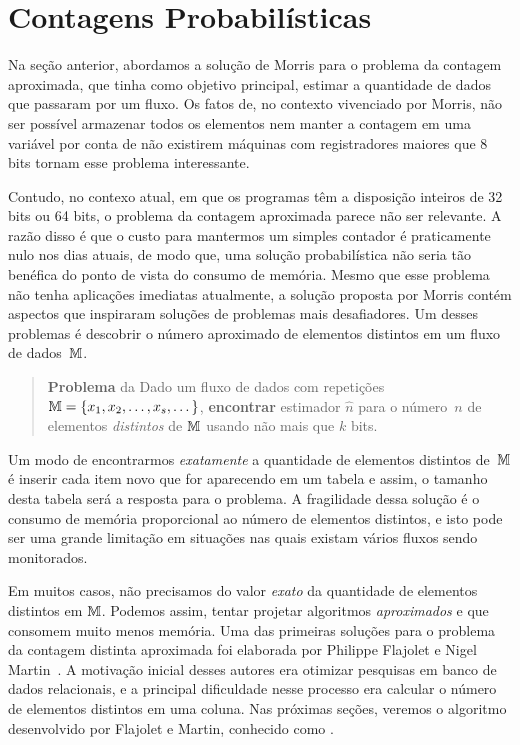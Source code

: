 \newcommand{\bitmap}{\proc{bmap}}
\newcommand{\pcounting}{\proc{Contagem Probabilística}}
\newcommand{\pc}{\textsf{ProbabilisticCounting}}
\newcommand{\pcpp}{\textsf{ProbabilisticCounting{++}}}

\chapter{Contagens Probabilísticas}
\label{lab:flajolet-martin}

Na seção anterior, abordamos a solução de Morris para o problema da contagem aproximada, que tinha como objetivo 
principal, estimar a quantidade de dados que passaram por um fluxo. Os fatos de, no contexto vivenciado por Morris, não 
ser possível armazenar todos os elementos nem manter a contagem em uma variável por conta de não existirem máquinas com 
registradores maiores que 8 bits tornam esse problema interessante.

Contudo, no contexo atual, em que os programas têm a disposição inteiros de 32 bits ou 64 bits, o problema da contagem
aproximada parece não ser relevante. A razão disso é que o custo para mantermos um simples contador é praticamente nulo 
nos dias atuais, de modo que, uma solução probabilística não seria tão benéfica do ponto de vista do consumo de memória.
Mesmo que esse problema não tenha aplicações imediatas atualmente, a solução proposta por Morris contém aspectos que 
inspiraram soluções de problemas mais desafiadores. Um desses problemas é descobrir o número aproximado de elementos 
distintos em um fluxo de dados~$\mathbb{M}$. 

\begin{quote}
  \textbf{Problema} da  Dado um fluxo de dados com repetições
  $\mathbb{M} = \{ x_1, x_2, \dots, x_s, \dots \}$, \textbf{encontrar} estimador $\hat{n}$ para o número~$n$ de elementos 
  \textit{distintos} de $\mathbb{M}$ usando não mais que $k$ bits.
\end{quote}

Um modo de encontrarmos \textit{exatamente} a quantidade de elementos distintos de~$\mathbb{M}$ é inserir cada item novo que 
for aparecendo em um tabela e assim, o tamanho desta tabela será a resposta para o problema. A fragilidade dessa solução 
é o consumo de memória proporcional ao número de elementos distintos, e isto pode ser uma grande limitação em situações 
nas quais existam vários fluxos sendo monitorados. 

Em muitos casos, não precisamos do valor \textit{exato} da quantidade de elementos distintos em $\mathbb{M}$. Podemos assim, 
tentar projetar algoritmos \textit{aproximados} e que consomem muito menos memória. Uma das primeiras soluções para o 
problema da contagem distinta aproximada foi elaborada por Philippe Flajolet e Nigel Martin~\citep{flajolet:martin:85}. 
A motivação inicial desses autores era otimizar pesquisas em banco de dados relacionais, e a principal dificuldade nesse 
processo era calcular o número de elementos distintos em uma coluna. Nas próximas seções, veremos o algoritmo 
desenvolvido por Flajolet e Martin, conhecido como .

